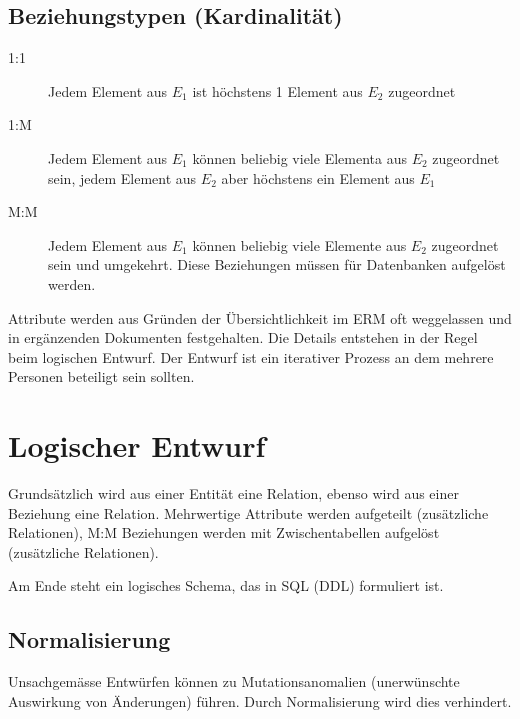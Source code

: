 \begin{center}
\end{center}

\subsection{Beziehungstypen (Kardinalität)}
\begin{description}
	\item [1:1] Jedem Element aus $E_1$ ist höchstens 1 Element aus $E_2$ zugeordnet
	\item [1:M] Jedem Element aus $E_1$ können beliebig viele Elementa aus $E_2$ zugeordnet sein,
	jedem Element aus $E_2$ aber höchstens ein Element aus $E_1$
	\item [M:M] Jedem Element aus $E_1$ können beliebig viele Elemente aus $E_2$ zugeordnet sein
	und umgekehrt. Diese Beziehungen müssen für Datenbanken aufgelöst werden.
\end{description}

Attribute werden aus Gründen der Übersichtlichkeit im ERM oft weggelassen und in ergänzenden Dokumenten festgehalten.
Die Details entstehen in der Regel beim logischen Entwurf. Der Entwurf ist ein iterativer Prozess an dem mehrere
Personen beteiligt sein sollten.  

\section{Logischer Entwurf}
Grundsätzlich wird aus einer Entität eine Relation, ebenso wird aus einer Beziehung eine Relation. Mehrwertige Attribute
werden aufgeteilt (zusätzliche Relationen), M:M Beziehungen werden mit Zwischentabellen aufgelöst (zusätzliche Relationen).

Am Ende steht ein logisches Schema, das in SQL (DDL) formuliert ist.

\subsection{Normalisierung}
Unsachgemässe Entwürfen können zu Mutationsanomalien (unerwünschte Auswirkung von Änderungen) führen. Durch
Normalisierung wird dies verhindert.

